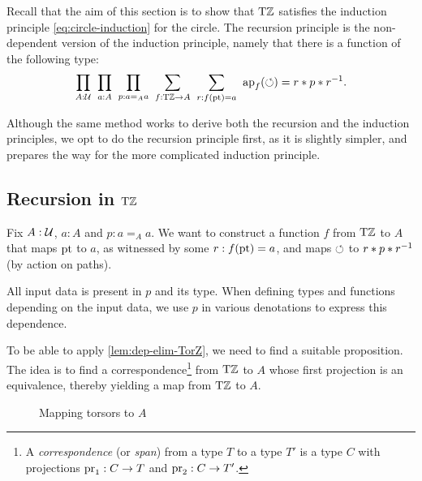 \documentclass[a4paper,12pt]{amsart}
\begin{document}
Recall that the aim of this section is to show that ${\mathrm{T}\mathbb{Z}}$ satisfies the induction principle \cref{eq:circle-induction} for the circle.
The recursion principle is the non-dependent version of the induction principle,
namely that there is a function of the following type:
\begin{equation}
  \label{eq:circle-recursion}
  \thinmuskip=10mu              %
  \prod_{A: \UU}
  \prod_{a: A}
  \prod_{p: a=_A a}
  \sum_{f: \TorZ \to A}
  \sum_{r: f(\pt)= a}
  {\ap{f}(\Zloop) = r\ct p \ct r^{-1}}.
\end{equation}

Although the same method works to derive both the recursion and the induction principles,
we opt to do the recursion principle first, as it is slightly simpler,
and prepares the way for the more complicated induction principle.

\subsection{Recursion in ${\mathrm{T}\mathbb{Z}}$}\label{sec:TorZ-recursion}

Fix $A:\mathcal{U}$, $a:A$ and $p: a=_A a$.
We want to construct a function $f$ from ${\mathrm{T}\mathbb{Z}}$ to $A$
that maps ${\mathord{\mathrm{pt}}}$ to $a$, as witnessed by some $r : f({\mathord{\mathrm{pt}}}) = a$,
and maps ${\circlearrowleft}$ to $r* p* r^{-1}$ (by action on paths).

All input data is present in $p$ and its type.
When defining types and functions depending on the input data,
we use $p$ in various denotations to express this dependence.

To be able to apply \cref{lem:dep-elim-TorZ}, we need to find a suitable proposition.
The idea is to find a correspondence\footnote{%
  A \emph{correspondence} (or \emph{span})
  from a type $T$ to a type $T'$ is a type $C$
  with projections $\operatorname{pr}_1 : C \to T$ and $\operatorname{pr}_2 : C \to T'$.}
from ${\mathrm{T}\mathbb{Z}}$ to $A$ whose first projection is an equivalence, thereby yielding a map from ${\mathrm{T}\mathbb{Z}}$ to $A$.

\begin{figure}

\caption{\label{fig:TorZ-recursion}Mapping torsors to $A$}
\end{figure}
\end{document}
